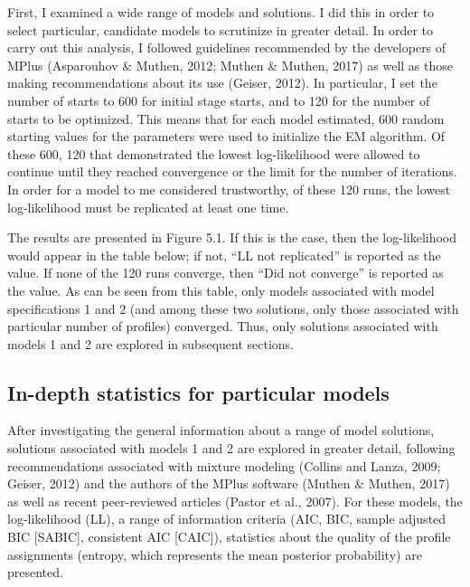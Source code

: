 \documentclass[]{book}
\theoremstyle{definition}
\theoremstyle{definition}
\theoremstyle{definition}
\theoremstyle{remark}
\begin{document}
First, I examined a wide range of models and solutions. I did this in
order to select particular, candidate models to scrutinize in greater
detail. In order to carry out this analysis, I followed guidelines
recommended by the developers of MPlus (Asparouhov \& Muthen, 2012;
Muthen \& Muthen, 2017) as well as those making recommendations about
its use (Geiser, 2012). In particular, I set the number of starts to 600
for initial stage starts, and to 120 for the number of starts to be
optimized. This means that for each model estimated, 600 random starting
values for the parameters were used to initialize the EM algorithm. Of
these 600, 120 that demonstrated the lowest log-likelihood were allowed
to continue until they reached convergence or the limit for the number
of iterations. In order for a model to me considered trustworthy, of
these 120 runs, the lowest log-likelihood must be replicated at least
one time.

The results are presented in Figure 5.1. If this is the case, then the
log-likelihood would appear in the table below; if not, ``LL not
replicated'' is reported as the value. If none of the 120 runs converge,
then ``Did not converge'' is reported as the value. As can be seen from
this table, only models associated with model specifications 1 and 2
(and among these two solutions, only those associated with particular
number of profiles) converged. Thus, only solutions associated with
models 1 and 2 are explored in subsequent sections.

\subsection{In-depth statistics for particular
models}\label{in-depth-statistics-for-particular-models}

After investigating the general information about a range of model
solutions, solutions associated with models 1 and 2 are explored in
greater detail, following recommendations associated with mixture
modeling (Collins and Lanza, 2009; Geiser, 2012) and the authors of the
MPlus software (Muthen \& Muthen, 2017) as well as recent peer-reviewed
articles (Pastor et al., 2007). For these models, the log-likelihood
(LL), a range of information criteria (AIC, BIC, sample adjusted BIC
{[}SABIC{]}, consistent AIC {[}CAIC{]}), statistics about the quality of
the profile assignments (entropy, which represents the mean posterior
probability) are presented.
\end{document}

